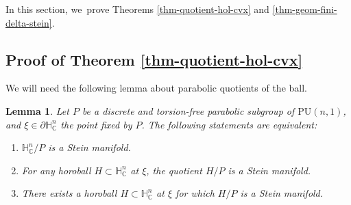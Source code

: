 \documentclass[11pt]{article}
\newtheorem{lemma}[theorem]{Lemma}
\theoremstyle{definition}
\newcommand{\C}{\mathbb{C}}
\newcommand{\HNC}{\mathbb{H}^{n}_{\C}}
\newcommand{\PHNC}{\partial\mathbb{H}^{n}_{\C}}
\newcommand{\PU}{\mathrm{PU}}
\def\C{\mathbb{C}}
\newcommand{\HNC}{\mathbb{H}^{n}_{\C}}
\newcommand{\PU}{\mathrm{PU}}
\begin{document}
In this section, we~prove Theorems \ref{thm-quotient-hol-cvx} and \ref{thm-geom-fini-delta-stein}.

\subsection{Proof of Theorem \ref{thm-quotient-hol-cvx}}

We will need the following lemma about parabolic quotients of the ball.

\begin{lemma}\label{lem-quotient-horoboule-stein}
Let $P$ be a discrete and torsion-free parabolic subgroup of $\PU(n,1)$, and $\xi\in \PHNC$ the point fixed by $P$. The following statements are equivalent:
\begin{enumerate}
\item\label{lem-quotient-horoboule-stein1} $\HNC/P$ is a Stein manifold.
\item\label{lem-quotient-horoboule-stein2} For any horoball $H\subset \HNC$ at $\xi$, the quotient $H/P$ is a Stein manifold.
\item\label{lem-quotient-horoboule-stein3} There exists a horoball $H\subset \HNC$ at $\xi$ for which $H/P$ is a Stein manifold.
\end{enumerate}
\end{lemma}
\end{document}

